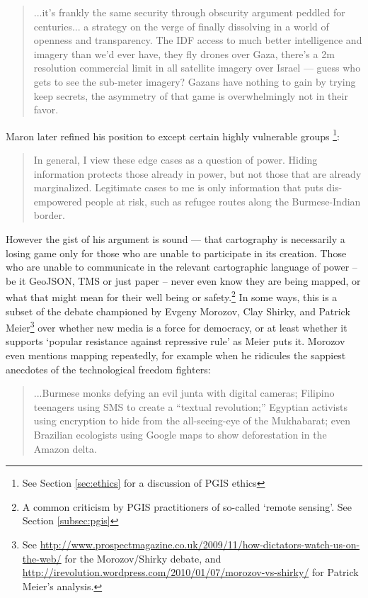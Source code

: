 \documentclass[11pt,oneside,notitlepage]{report}
\begin{document}
\begin{quote}
...it's frankly the same security through obscurity argument peddled for centuries... a strategy on the verge of finally dissolving in a world of openness and transparency. The IDF access to much better intelligence and imagery than we'd ever have, they fly drones over Gaza, there's a 2m resolution commercial limit in all satellite imagery over Israel — guess who gets to see the sub-meter imagery? Gazans have nothing to gain by trying keep secrets, the asymmetry of that game is overwhelmingly not in their favor. \cite{maron2009misconceptions}
\end{quote}

Maron later refined his position to except certain highly vulnerable groups \footnote{See Section \ref{sec:ethics} for a discussion of \ac{PGIS} ethics}:

\begin{quote}
In general, I view these edge cases as a question of power. Hiding information protects those already in power, but not those that are already marginalized. Legitimate cases to me is only information that puts dis-empowered people at risk, such as refugee routes along the Burmese-Indian border. \cite{maron2010freedom}
\end{quote}

However the gist of his argument is sound --- that cartography is necessarily a losing game only for those who are unable to participate in its creation. Those who are unable to communicate in the relevant cartographic language of power -- be it GeoJSON, \ac{TMS} or just paper -- never even know they are being mapped, or what that might mean for their well being or safety.\footnote{A common criticism by \ac{PGIS} practitioners of so-called `remote sensing'. See Section \ref{subsec:pgis}} In some ways, this is a subset of the debate championed by Evgeny Morozov, Clay Shirky, and Patrick Meier\footnote{See \url{http://www.prospectmagazine.co.uk/2009/11/how-dictators-watch-us-on-the-web/} for the Morozov/Shirky debate, and \url{http://irevolution.wordpress.com/2010/01/07/morozov-vs-shirky/} for Patrick Meier's analysis.} over whether new media is a force for democracy, or at least whether it supports `popular resistance against repressive rule' as Meier puts it. \cite{meier2010popular} Morozov even mentions mapping repeatedly, for example when he ridicules the sappiest anecdotes of the technological freedom fighters: 
 
\begin{quote}
...Burmese monks defying an evil junta with digital cameras; Filipino teenagers using SMS to create a “textual revolution;” Egyptian activists using encryption to hide from the all-seeing-eye of the Mukhabarat; even Brazilian ecologists using Google maps to show deforestation in the Amazon delta. \cite{morozov2009dictators}
\end{quote}
\end{document}
